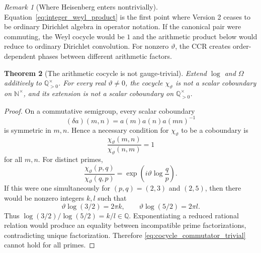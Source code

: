 \documentclass[11pt]{amsart}
\numberwithin{equation}{section}
\theoremstyle{plain}
\newtheorem{theorem}{Theorem}[section]
\theoremstyle{definition}
\theoremstyle{remark}
\newtheorem{remark}[theorem]{Remark}
\begin{document}
\begin{remark}[Where Heisenberg enters nontrivially]
\label{rem:where_heisenberg_enters}
Equation~\eqref{eq:integer_weyl_product} is the first point where Version 2
ceases to be ordinary Dirichlet algebra in operator notation.  If the
canonical pair were commuting, the Weyl cocycle would be $1$ and the
arithmetic product below would reduce to ordinary Dirichlet convolution.
For nonzero $\vartheta$, the CCR creates order-dependent phases between
different arithmetic factors.
\end{remark}

\begin{theorem}[The arithmetic cocycle is not gauge-trivial]
\label{thm:cocycle_nontrivial}
Extend \(\log\) and \(\Omega\) additively to
\(\mathbb Q_{>0}^{\times}\).  For every real \(\vartheta\ne0\), the
cocycle \(\chi_\vartheta\) is not a scalar coboundary on
\(\mathbb N^{\times}\), and its extension is not a scalar coboundary on
\(\mathbb Q_{>0}^{\times}\).
\end{theorem}

\begin{proof}
On a commutative semigroup, every scalar coboundary
\begin{equation}
(\delta a)(m,n)=a(m)a(n)a(mn)^{-1}
\label{eq:scalar_coboundary}
\end{equation}
is symmetric in \(m,n\).  Hence a necessary condition for
\(\chi_\vartheta\) to be a coboundary is
\begin{equation}
\frac{\chi_\vartheta(m,n)}{\chi_\vartheta(n,m)}=1
\label{eq:cocycle_commutator_trivial}
\end{equation}
for all \(m,n\).  For distinct primes,
\begin{equation}
\frac{\chi_\vartheta(p,q)}{\chi_\vartheta(q,p)}
=
\exp\left(i\vartheta\log\frac{q}{p}\right).
\label{eq:prime_cocycle_commutator}
\end{equation}
If this were one simultaneously for \((p,q)=(2,3)\) and \((2,5)\), then
there would be nonzero integers \(k,l\) such that
\begin{equation}
\vartheta\log(3/2)=2\pi k,
\qquad
\vartheta\log(5/2)=2\pi l.
\label{eq:two_prime_phase_integrality}
\end{equation}
Thus \(\log(3/2)/\log(5/2)=k/l\in\mathbb Q\).  Exponentiating a
reduced rational relation would produce an equality between incompatible
prime factorizations, contradicting unique factorization.  Therefore
\eqref{eq:cocycle_commutator_trivial} cannot hold for all primes.
\end{proof}
\end{document}
